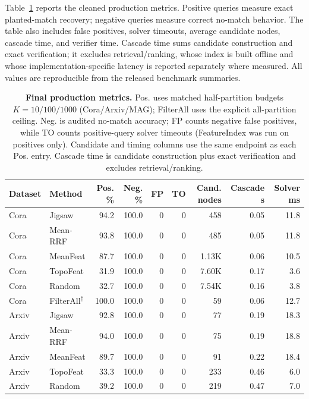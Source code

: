 \documentclass{article}
\begin{document}
Table~\ref{tab:production_matrix} reports the cleaned production metrics. Positive queries measure exact planted-match recovery; negative queries measure correct no-match behavior. The table also includes false positives, solver timeouts, average candidate nodes, cascade time, and verifier time. Cascade time sums candidate construction and exact verification; it excludes retrieval/ranking, whose index is built offline and whose implementation-specific latency is reported separately where measured. All values are reproducible from the released benchmark summaries.

\begin{table}[t]
\centering
\caption{\textbf{Final production metrics.} Pos. uses matched half-partition budgets $K{=}10/100/1000$ (Cora/Arxiv/MAG); FilterAll uses the explicit all-partition ceiling. Neg. is audited no-match accuracy; FP counts negative false positives, while TO counts positive-query solver timeouts (FeatureIndex was run on positives only). Candidate and timing columns use the same endpoint as each Pos. entry. Cascade time is candidate construction plus exact verification and excludes retrieval/ranking.}
\label{tab:production_matrix}
\scriptsize
\setlength{\tabcolsep}{2.5pt}
\begin{tabular}{llrrrrrrr}
\toprule
\textbf{Dataset} & \textbf{Method} & \textbf{Pos. \%} & \textbf{Neg. \%} & \textbf{FP} & \textbf{TO} & \textbf{Cand. nodes} & \textbf{Cascade s} & \textbf{Solver ms} \\
\midrule
Cora & Jigsaw & 94.2 & 100.0 & 0 & 0 & 458 & 0.05 & 11.8 \\
Cora & Mean-RRF & 93.8 & 100.0 & 0 & 0 & 485 & 0.05 & 11.8 \\
Cora & MeanFeat & 87.7 & 100.0 & 0 & 0 & 1.13K & 0.06 & 10.5 \\
Cora & TopoFeat & 31.9 & 100.0 & 0 & 0 & 7.60K & 0.17 & 3.6 \\
Cora & Random & 32.7 & 100.0 & 0 & 0 & 7.54K & 0.16 & 3.8 \\
Cora & FilterAll$^\ddagger$ & 100.0 & 100.0 & 0 & 0 & 59 & 0.06 & 12.7 \\
\midrule
Arxiv & Jigsaw & 92.8 & 100.0 & 0 & 0 & 77 & 0.19 & 18.3 \\
Arxiv & Mean-RRF & 94.0 & 100.0 & 0 & 0 & 75 & 0.19 & 18.8 \\
Arxiv & MeanFeat & 89.7 & 100.0 & 0 & 0 & 91 & 0.22 & 18.4 \\
Arxiv & TopoFeat & 33.3 & 100.0 & 0 & 0 & 233 & 0.46 & 6.0 \\
Arxiv & Random & 39.2 & 100.0 & 0 & 0 & 219 & 0.47 & 7.0 \\

\end{tabular}
\end{table}
\end{document}
